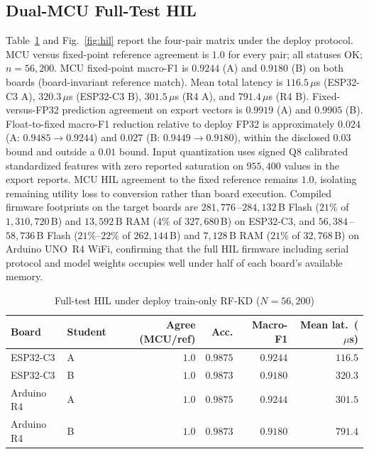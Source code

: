 \documentclass[journal]{IEEEtran}
\begin{document}
\subsection{Dual-MCU Full-Test HIL}
\label{sec:results-hil}
Table~\ref{tab:hil} and Fig.~\ref{fig:hil} report the four-pair matrix under the deploy protocol.
MCU versus fixed-point reference agreement is $1.0$ for every pair; all statuses OK; $n = 56{,}200$.
MCU fixed-point macro-F1 is $0.9244$ (A) and $0.9180$ (B) on both boards (board-invariant reference match).
Mean total latency is $116.5$\,$\mu$s (ESP32-C3 A), $320.3$\,$\mu$s (ESP32-C3 B), $301.5$\,$\mu$s (R4 A), and $791.4$\,$\mu$s (R4 B).
Fixed-versus-FP32 prediction agreement on export vectors is $0.9919$ (A) and $0.9905$ (B).
Float-to-fixed macro-F1 reduction relative to deploy FP32 is approximately $0.024$ (A: $0.9485 \rightarrow 0.9244$) and $0.027$ (B: $0.9449 \rightarrow 0.9180$), within the disclosed $0.03$ bound and outside a $0.01$ bound.
Input quantization uses signed Q8 calibrated standardized features with zero reported saturation on $955{,}400$ values in the export reports.
MCU HIL agreement to the fixed reference remains $1.0$, isolating remaining utility loss to conversion rather than board execution.
Compiled firmware footprints on the target boards are $281{,}776$\,--$284{,}132$\,B Flash ($21\%$ of $1{,}310{,}720$\,B) and $13{,}592$\,B RAM ($4\%$ of $327{,}680$\,B) on ESP32-C3, and $56{,}384$\,--$58{,}736$\,B Flash ($21\%$--$22\%$ of $262{,}144$\,B) and $7{,}128$\,B RAM ($21\%$ of $32{,}768$\,B) on Arduino UNO~R4 WiFi, confirming that the full HIL firmware including serial protocol and model weights occupies well under half of each board's available memory.

\begin{table}[!t]
\caption{Full-test HIL under deploy train-only RF-KD ($N = 56{,}200$)}
\label{tab:hil}
\centering
\small
\begin{tabular}{llrrrr}
\toprule
Board & Student & Agree (MCU/ref) & Acc. & Macro-F1 & Mean lat.\ ($\mu$s) \\
\midrule
ESP32-C3 & A & $1.0$ & $0.9875$ & $0.9244$ & $116.5$ \\
ESP32-C3 & B & $1.0$ & $0.9873$ & $0.9180$ & $320.3$ \\
Arduino R4 & A & $1.0$ & $0.9875$ & $0.9244$ & $301.5$ \\
Arduino R4 & B & $1.0$ & $0.9873$ & $0.9180$ & $791.4$ \\
\bottomrule
\end{tabular}
\end{table}
\end{document}
